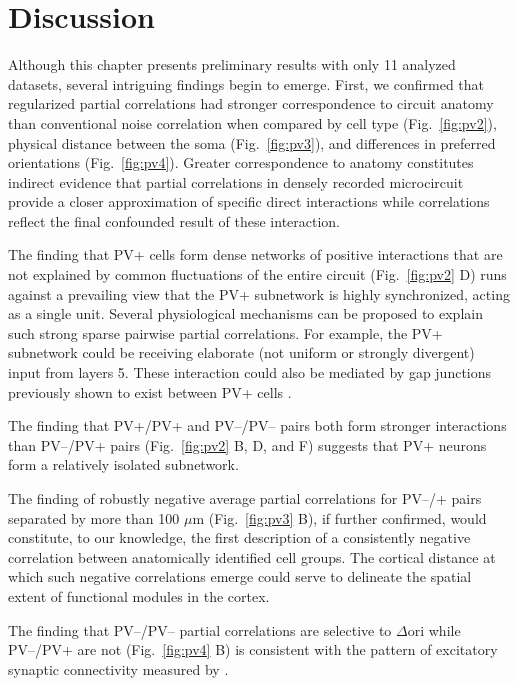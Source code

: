 \section{Discussion}

Although this chapter presents preliminary results with only 11 analyzed datasets, several intriguing findings begin to emerge.
First, we confirmed that regularized partial correlations had stronger correspondence to circuit anatomy than conventional noise correlation when compared by cell type (Fig.~\ref{fig:pv2}), physical distance between the soma (Fig.~\ref{fig:pv3}), and differences in preferred orientations (Fig.~\ref{fig:pv4}). Greater correspondence to anatomy constitutes indirect evidence that partial correlations in densely recorded microcircuit provide a closer approximation of specific direct interactions while correlations reflect the final confounded result of these interaction.

The finding that PV+ cells form dense networks of positive interactions that are not explained by common fluctuations of the entire circuit (Fig.~\ref{fig:pv2} D) runs against a prevailing view that the PV+ subnetwork is highly synchronized, acting as a single unit. Several physiological mechanisms can be proposed to explain such strong sparse  pairwise partial correlations. For example, the PV+ subnetwork could be receiving  elaborate (not uniform or strongly divergent) input from layers 5.  These interaction could also be mediated by gap junctions previously shown to exist between PV+ cells \cite{Tamas:2000}. 

The finding that PV+/PV+ and PV--/PV-- pairs both form stronger interactions than PV--/PV+ pairs (Fig.~\ref{fig:pv2} B, D, and F) suggests that PV+ neurons form a relatively isolated subnetwork. 

The finding of robustly negative average partial correlations for PV--/+ pairs separated by more than 100 $\mu$m (Fig.~\ref{fig:pv3} B), if further confirmed, would constitute, to our knowledge, the first description of a consistently negative correlation between anatomically identified cell groups. 
The cortical distance at which such negative correlations emerge could serve to delineate the spatial extent of functional modules in the cortex.

The finding that PV--/PV-- partial correlations are selective to $\Delta$ori while PV--/PV+ are not (Fig.~\ref{fig:pv4} B)  is consistent with the pattern of excitatory synaptic connectivity measured by \cite{Hofer:2011}. 
